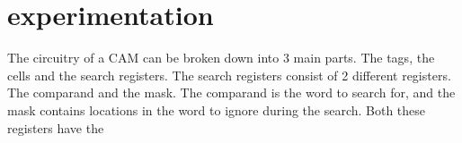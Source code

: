 \section{experimentation}
The circuitry of a CAM can be broken down into 3 main parts. The tags, the cells and the search registers. 
The search registers consist of 2 different registers. 
The comparand and the mask. The comparand is the word to search for, and the mask contains locations in the word to ignore during the search.
Both these registers have the